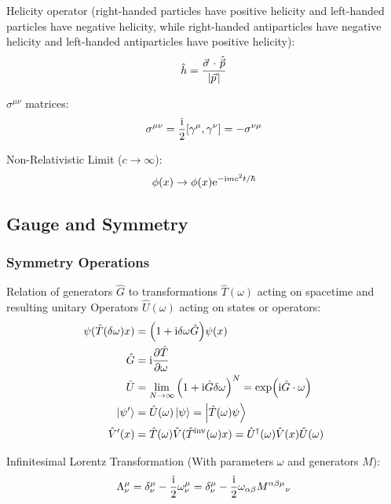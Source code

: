 			\noindent
			Helicity operator (\ie right-handed particles have positive helicity and left-handed particles have negative helicity, while right-handed antiparticles have negative helicity and left-handed antiparticles have positive helicity):
			\begin{equation}
				\hat{h} = \frac{\vec{\sigma}\cdot\hat{\vec{p}}}{\abs{\vec{p}}}
			\end{equation}

			\noindent
			$\sigma^{\mu\nu}$ matrices:
			\begin{equation}
				\sigma^{\mu\nu} = \frac{\i}{2}\comm{\gamma^\mu}{\gamma^\nu} = -\sigma^{\nu\mu}
			\end{equation}

			\noindent
			Non-Relativistic Limit ($c\rightarrow\infty$):
			\begin{equation}
				\phi(x) \rightarrow \phi(x) \mathrm{e}^{-\mathrm{i} m c^2 t/\hbar}
			\end{equation}

	\subsection{Gauge and Symmetry}
		\subsubsection{Symmetry Operations}
			Relation of generators $\hat{G}$ to transformations $\hat{T}(\omega)$ acting on spacetime and resulting unitary Operators $\hat{U}(\omega)$ acting on states or operators:
			\begin{equation}
				\begin{aligned}
					\psi(\hat{T}(\delta \omega)x) &= \qty(1+ \mathrm{i} \delta\omega \hat{G}) \psi(x)\\
					\hat{G} &= \mathrm{i} \pdv{\hat{T}}{\omega} \\
					\hat{U} &= \lim_{N\rightarrow \infty} \qty(1+\mathrm{i}\hat{G}\delta\omega)^N = \exp(\mathrm{i} \hat{G} \cdot \omega) \\
					\Ket{\psi'} &= \hat{U}(\omega)\Ket{\psi} = \Ket{\hat{T}(\omega)\psi} \\
					\hat{V}'(x) &= \hat{T}(\omega) \hat{V}({\hat{T}}^\mathrm{inv}(\omega)x) = \hat{U}^\dagger(\omega) \hat{V}(x) \hat{U}(\omega) \\
				\end{aligned}
			\end{equation}
		
			\noindent
			Infinitesimal Lorentz Transformation (With parameters $\omega$ and generators $M$):
			\begin{equation}
				\begin{aligned}
					\Lambda^\mu_\nu &= \delta^\mu_\nu - \frac{\mathrm{i}}{2}\omega^\mu_\nu = \delta^\mu_\nu - \frac{\mathrm{i}}{2}\omega_{\alpha\beta}M^{\alpha\beta\mu}{}_\nu \\
				\end{aligned}
			\end{equation}
		
